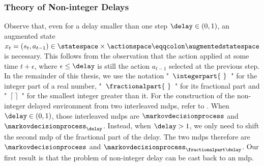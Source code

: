 \subsubsection{Theory of Non-integer Delays}
Observe that, even for a delay smaller than one step $\delay\in (0,1)$, an augmented state $x_t = (s_t,a_{t-1})\in \statespace \times \actionspace \eqqcolon \augmentedstatespace$ is necessary.
This follows from the observation that the action applied at some time $t+\epsilon$, where $\epsilon\le\delay$ is still the action $a_{t-1}$ selected at the previous step. 
In the remainder of this thesis, we use the notation "~$\integerpart{\ }$~" for the integer part of a real number, "~$\fractionalpart{\ }$~"  for its fractional part and "~$\lceil\ \rceil$~" for the smallest integer greater than it. 
For the construction of the non-integer delayed environment from two interleaved \glspl{mdp}, refer to . 
When $\delay\in (0,1)$, those interleaved \glspl{mdp} are $\markovdecisionprocess$ and $\markovdecisionprocess_\delay$. 
Instead, when $\delay>1$, we only need to shift the second \gls{mdp} of the fractional part of the delay. The two \glspl{mdp} therefore are $\markovdecisionprocess$ and $\markovdecisionprocess_{\fractionalpart\delay}$. 
Our first result is that the problem of non-integer delay can be cast back to an \gls{mdp}. 

